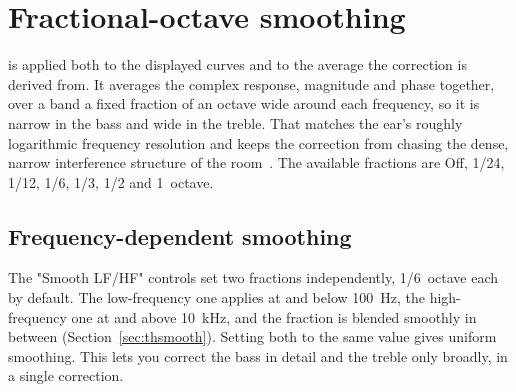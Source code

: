 \section{Fractional-octave smoothing}\label{sec:smoothing}
 is applied both to the displayed curves and to the average the correction is derived from. It averages the complex response, magnitude and phase together, over a band a fixed fraction of an octave wide around each frequency, so it is narrow in the bass and wide in the treble. That matches the ear's roughly logarithmic frequency resolution and keeps the correction from chasing the dense, narrow interference structure of the room~\cite{Hatziantoniou2000}. The available fractions are Off, 1/24, 1/12, 1/6, 1/3, 1/2 and 1~octave.

\subsection{Frequency-dependent smoothing}\label{sec:varsmooth}
The "Smooth LF/HF" controls set two fractions independently, 1/6~octave each by default. The low-frequency one applies at and below \SI{100}{\hertz}, the high-frequency one at and above \SI{10}{\kilo\hertz}, and the fraction is blended smoothly in between (Section~\ref{sec:thsmooth}). Setting both to the same value gives uniform smoothing. This lets you correct the bass in detail and the treble only broadly, in a single correction.

